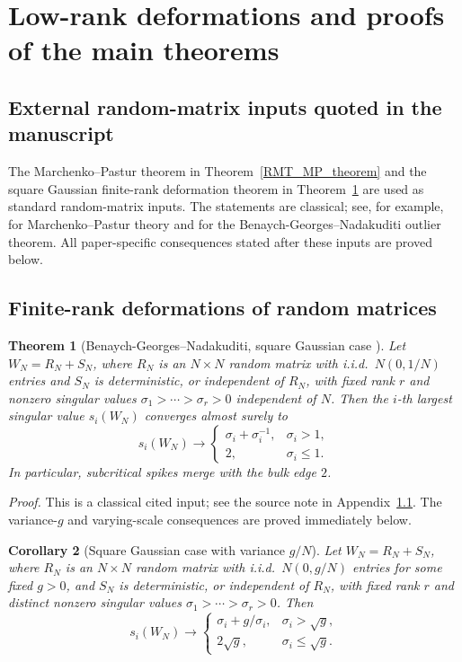\documentclass[11pt]{article}
\theoremstyle{plain}
\newtheorem{thm}{Theorem}[section]
\newtheorem{cor}[thm]{Corollary}
\theoremstyle{definition}
\theoremstyle{remark}
\newcommand{\1}{\mathbf{1}}
\newcommand{\proofloc}[1]{\par\noindent\emph{Proof.} #1\par}
\begin{document}
\section{Low-rank deformations and proofs of the main theorems}
\label{app:proofs_main}

\subsection{External random-matrix inputs quoted in the manuscript}
\label{app:external_rmt_inputs}

The Marchenko--Pastur theorem in Theorem~\ref{RMT_MP_theorem} and the square Gaussian finite-rank deformation theorem in Theorem~\ref{thm:BGN_square} are used as standard random-matrix inputs. The statements are classical; see, for example, \cite{marchenko1967distribution} for Marchenko--Pastur theory and \cite{benaych2012singular} for the Benaych-Georges--Nadakuditi outlier theorem. All paper-specific consequences stated after these inputs are proved below.

\subsection{Finite-rank deformations of random matrices}

\begin{thm}[Benaych-Georges--Nadakuditi, square Gaussian case \cite{benaych2012singular}]
\label{thm:BGN_square}
Let \(W_N=R_N+S_N\), where \(R_N\) is an \(N\times N\) random matrix with i.i.d.\ \(N(0,1/N)\) entries and \(S_N\) is deterministic, or independent of \(R_N\), with fixed rank \(r\) and nonzero singular values \(\sigma_1>\cdots>\sigma_r>0\) independent of \(N\). Then the \(i\)-th largest singular value \(s_i(W_N)\) converges almost surely to
\[
s_i(W_N)\to
\begin{cases}
\sigma_i+\sigma_i^{-1}, & \sigma_i>1,\\[0.2em]
2, & \sigma_i\le 1.
\end{cases}
\]
In particular, subcritical spikes merge with the bulk edge \(2\).
\end{thm}
\proofloc{This is a classical cited input; see the source note in Appendix~\ref{app:external_rmt_inputs}. The variance-\(g\) and varying-scale consequences are proved immediately below.}

\begin{cor}[Square Gaussian case with variance \(g/N\)]
\label{cor:BGN_square_g}
Let \(W_N=R_N+S_N\), where \(R_N\) is an \(N\times N\) random matrix with i.i.d.\ \(N(0,g/N)\) entries for some fixed \(g>0\), and \(S_N\) is deterministic, or independent of \(R_N\), with fixed rank \(r\) and distinct nonzero singular values \(\sigma_1>\cdots>\sigma_r>0\). Then
\[
s_i(W_N)\to
\begin{cases}
\sigma_i+g/\sigma_i, & \sigma_i>\sqrt g,\\[0.2em]
2\sqrt g, & \sigma_i\le \sqrt g.
\end{cases}
\]
\end{cor}
\end{document}
